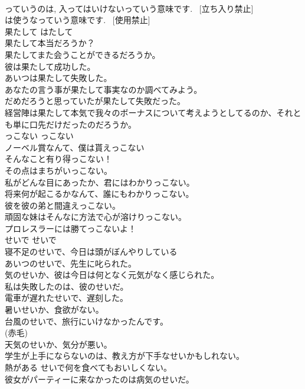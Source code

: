 \documentclass[8pt]{extreport}
\begin{document}
\begin{CJK}{UTF8}{min}
\\	[立ち入り禁止]っていうのは, 入ってはいけないっていう意味です.  [立ち入り禁止] 
\\	[使用禁止]は使うなっていう意味です.  [使用禁止] 
\\	果たして	はたして	
\\	果たして本当だろうか？  
\\	果たしてまた会うことができるだろうか。  
\\	彼は果たして成功した。  
\\	あいつは果たして失敗した。  
\\	あなたの言う事が果たして事実なのか調べてみよう。  
\\	だめだろうと思っていたが果たして失敗だった。  
\\	経営陣は果たして本気で我々のボーナスについて考えようとしてるのか、それとも単に口先だけだったのだろうか。  
\\	っこない	っこない	
\\	ノーベル賞なんて、僕は貰えっこない  
\\	そんなこと有り得っこない！  
\\	その点はまちがいっこない。  
\\	私がどんな目にあったか、君にはわかりっこない。  
\\	将来何が起こるかなんて、誰にもわかりっこない。  
\\	彼を彼の弟と間違えっこない。  
\\	頑固な妹はそんなに方法で心が溶けりっこない。  
\\	プロレスラーには勝てっこないよ！  
\\	せいで	せいで	
\\	寝不足のせいで、今日は頭がぼんやりしている  
\\	あいつのせいで、先生に叱られた。  
\\	気のせいか、彼は今日は何となく元気がなく感じられた。  
\\	私は失敗したのは、彼のせいだ。  
\\	電車が遅れたせいで、遅刻した。  
\\	暑いせいか、食欲がない。  
\\	台風のせいで、旅行にいけなかったんです。  
\\	(赤毛)
\\	天気のせいか、気分が悪い。   
\\	学生が上手にならないのは、教え方が下手なせいかもしれない。  
\\	熱がある せいで何を食べてもおいしくない。  
\\	彼女がパーティーに来なかったのは病気のせいだ。   

\end{CJK}
\end{document}
